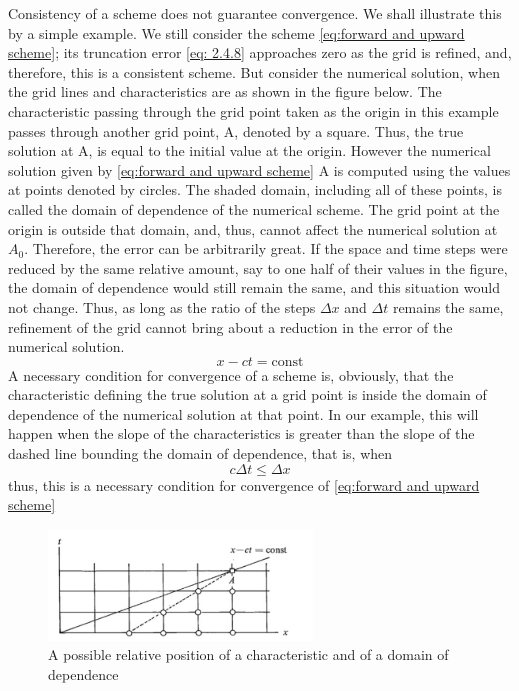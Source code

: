 Consistency of a scheme does not guarantee conver­gence. We shall illustrate this by a simple example. We still consider the scheme \ref{eq:forward and upward scheme}; its truncation error \ref{eq: 2.4.8} approaches zero as the grid is refined, and, there­fore, this is a consistent scheme. But consider the numerical solution, when the grid lines and character­istics are as shown in the figure below. The characteristic passing through the grid point taken as the origin in this example passes through another grid point, A, denoted by a square. Thus, the true solution at A, is equal to the initial value at the origin. However the numerical solution given by \ref{eq:forward and upward scheme} A is computed using the values at points denoted by circles. The shaded domain, including all of these points, is called the domain of dependence of the numerical scheme. The grid point at the origin is outside that domain, and, thus, cannot affect the numerical solution at $A_0$. Therefore, the error can be arbitrarily great. If the space and time steps were reduced by the same relative amount, say to one half of their values in the figure, the domain of dependence would still remain the same, and this situation would not change. Thus, as long as the ratio of the steps $\Delta x$ and $\Delta t$ remains the same, refinement of the grid cannot bring about a reduction in the error of the numerical solution.
$$x-ct=\text{const}$$
A necessary condition for convergence of a scheme is, obviously, that the characteristic defining the true solution at a grid point is inside the domain of dependence of the numerical solution at that point. In our example, this will happen when the slope of the characteristics is greater than the slope of the dashed line bounding the domain of dependence, that is, when $$c\Delta t\leq \Delta x$$
thus, this is a necessary condition for convergence of \ref{eq:forward and upward scheme}
\begin{figure}[h]
	\centering
	\includegraphics[width=7cm]{uploads/Screenshot 2024-11-10 192132.png}
	\caption{A possible relative position of a characteristic and of a domain of dependence}
	\label{fig:grid sol}
\end{figure}
